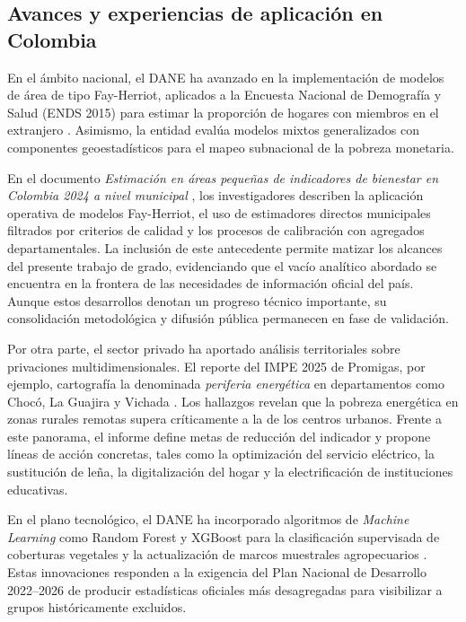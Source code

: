 \subsection{Avances y experiencias de aplicación en Colombia}
        En el ámbito nacional, el DANE ha avanzado en la implementación de modelos de área de tipo Fay-Herriot, aplicados a la Encuesta Nacional de Demografía y Salud (ENDS 2015) para estimar la proporción de hogares con miembros en el extranjero \cite{dane2024}. Asimismo, la entidad evalúa modelos mixtos generalizados con componentes geoestadísticos para el mapeo subnacional de la pobreza monetaria.
        
        En el documento \textit{Estimación en áreas pequeñas de indicadores de bienestar en Colombia 2024 a nivel municipal} \cite{dane2024}, los investigadores describen la aplicación operativa de modelos Fay-Herriot, el uso de estimadores directos municipales filtrados por criterios de calidad y los procesos de calibración con agregados departamentales. La inclusión de este antecedente permite matizar los alcances del presente trabajo de grado, evidenciando que el vacío analítico abordado se encuentra en la frontera de las necesidades de información oficial del país.  Aunque estos desarrollos denotan un progreso técnico importante, su consolidación metodológica y difusión pública permanecen en fase de validación.
    
        Por otra parte, el sector privado ha aportado análisis territoriales sobre privaciones multidimensionales. El reporte del IMPE 2025 de Promigas, por ejemplo, cartografía la denominada \textit{periferia energética} en departamentos como Chocó, La Guajira y Vichada \cite{promigas2025}. Los hallazgos revelan que la pobreza energética en zonas rurales remotas supera críticamente a la de los centros urbanos. Frente a este panorama, el informe define metas de reducción del indicador y propone líneas de acción concretas, tales como la optimización del servicio eléctrico, la sustitución de leña, la digitalización del hogar y la electrificación de instituciones educativas.
    
        En el plano tecnológico, el DANE ha incorporado algoritmos de \textit{Machine Learning} como Random Forest y XGBoost para la clasificación supervisada de coberturas vegetales y la actualización de marcos muestrales agropecuarios \cite{dane2024}. Estas innovaciones responden a la exigencia del Plan Nacional de Desarrollo 2022--2026 de producir estadísticas oficiales más desagregadas para visibilizar a grupos históricamente excluidos.

